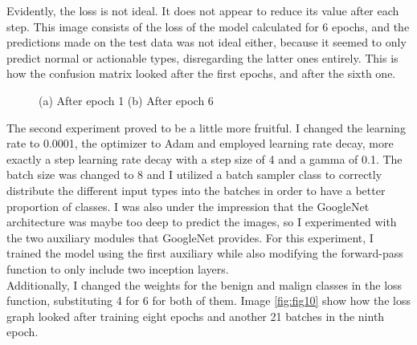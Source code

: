 Evidently, the loss is not ideal. It does not appear to reduce its value after each step. This image consists of the loss of the model calculated for 6 epochs, and the predictions made on the test data was not ideal either, because it seemed to only predict normal or actionable types, disregarding the latter ones entirely. This is how the confusion matrix looked after the first epochs, and after the sixth one.\\
\begin{figure}[!ht]
    \caption{(a) After epoch 1 (b) After epoch 6}
    \label{fig:fig9}
\end{figure}
The second experiment proved to be a little more fruitful. I changed the learning rate to 0.0001, the optimizer to Adam and employed learning rate decay, more exactly a step learning rate decay with a step size of 4 and a gamma of 0.1. The batch size was changed to 8 and I utilized a batch sampler class to correctly distribute the different input types into the batches in order to have a better proportion of classes. I was also under the impression that the GoogleNet architecture was maybe too deep to predict the images, so I experimented with the two auxiliary modules that GoogleNet provides. For this experiment, I trained the model using the first auxiliary while also modifying the forward-pass function to only include two inception layers.\\
Additionally, I changed the weights for the benign and malign classes in the loss function, substituting 4 for 6 for both of them. Image \ref{fig:fig10} show how the loss graph looked after training eight epochs and another 21 batches in the ninth epoch.\\
